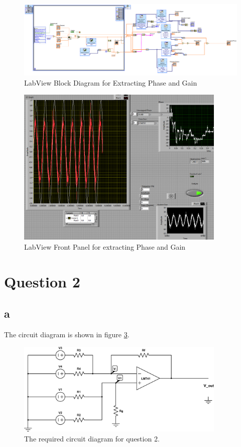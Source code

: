 \documentclass{article}
\theoremstyle{plain}
\theoremstyle{definition}
\theoremstyle{remark}
\begin{document}
\begin{figure}[h]
\begin{center}
\includegraphics[width = 17cm]{blockDiagram.png}
\caption{LabView Block Diagram for Extracting Phase and Gain}
\label{q1_j1}
\end{center}
\end{figure}

\begin{figure}[h]
\begin{center}
\includegraphics[width = 10cm]{frontPannel.png}
\caption{LabView Front Panel for extracting Phase and Gain}
\label{q1_j2}
\end{center}
\end{figure}

\section*{Question 2}

\subsection*{a}
The circuit diagram is shown in figure \ref{q2_a}.
\begin{figure}[h]
\begin{center}
\includegraphics[width=10cm]{q2_circuitDiagram.png}
\end{center}
\caption{The required circuit diagram for question 2.}
\label{q2_a}
\end{figure}
\end{document}

